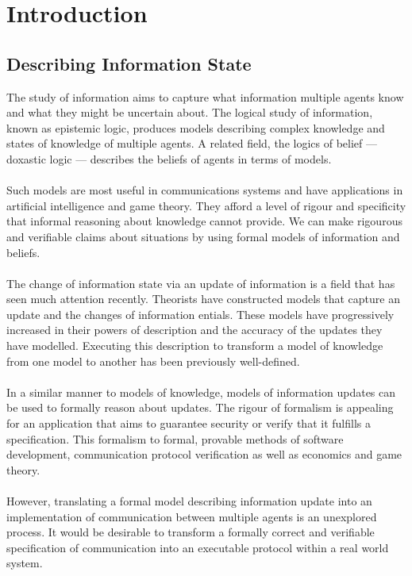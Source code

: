 \documentclass[12pt, a4paper, twoside]{article}
\begin{document}

\tableofcontents

\vfill
\pagebreak

\section{Introduction}\label{intro}
\subsection{Describing Information State}\label{intro_infoState}
The study of information aims to capture what information multiple agents know
and what they might be uncertain about.
The logical study of information, known as epistemic logic, produces models
describing complex knowledge and states of knowledge of multiple agents.
A related field, the logics of belief --- doxastic logic --- describes the
beliefs of agents in terms of models.\\
\\
Such models are most useful in communications systems and have applications in
artificial intelligence and game theory.
They afford a level of rigour and specificity that informal reasoning about
knowledge cannot provide.
We can make rigourous and verifiable claims about situations by using
formal models of information and beliefs.\\
\\
The change of information state via an update of information is a field that has
seen much attention recently.
Theorists have constructed models that capture an update and the changes of
information entials.
These models have progressively increased in their powers of description and the
accuracy of the updates they have modelled.
Executing this description to transform a model of knowledge from one model to
another has been previously well-defined.\\
\\
In a similar manner to models of knowledge, models of information updates can be
used to formally reason about updates.
The rigour of formalism is appealing for an application that aims to guarantee
security or verify that it fulfills a specification.
This formalism to formal, provable methods of software development,
communication protocol verification as well as economics and game theory.\\
\\
However, translating a formal model describing information update into an
implementation of communication between multiple agents is an unexplored
process.
It would be desirable to transform a formally correct and verifiable specification of
communication into an executable protocol within a real world system.
\end{document}
